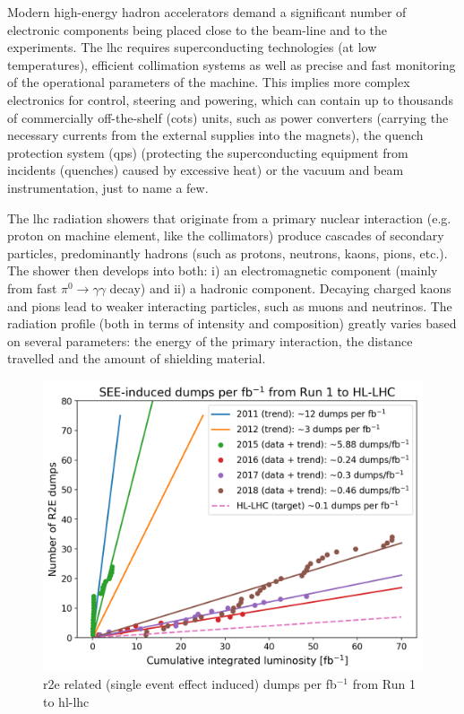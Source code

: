 \documentclass[encoding=utf8,british]{tumphthesis}
\begin{document}
Modern high-energy hadron accelerators demand a significant number of electronic components being placed close to the beam-line and to the experiments. The \acrshort{lhc} requires superconducting technologies (at low temperatures), efficient collimation systems as well as precise and fast monitoring of the operational parameters of the machine. This implies more complex electronics for control, steering and powering, which can contain up to thousands of commercially off-the-shelf (\acrshort{cots}) units, such as power converters (carrying the necessary currents from the external supplies into the magnets), the  quench protection system (\acrshort{qps}) (protecting the superconducting equipment from incidents (quenches)  caused by excessive heat) or the vacuum and beam instrumentation, just to name a few.


\begin{minipage}[t]{0.35\linewidth}


The \acrshort{lhc} radiation showers that originate from a primary nuclear interaction (e.g. proton on machine element, like the collimators) produce cascades of secondary particles, predominantly hadrons (such as protons, neutrons, kaons, pions, etc.). The shower then develops into both: i) an electromagnetic component (mainly from fast $\pi^0 \to \gamma\gamma$ decay) and ii) a hadronic component. Decaying charged kaons and pions lead to weaker interacting particles, such as muons and neutrinos. The radiation profile (both in terms of intensity and composition) greatly varies based on several parameters: the energy of the primary interaction, the distance travelled and the amount of shielding material.

\end{minipage}
\hspace{0.5cm}
\hfill%
\begin{minipage}[t]{0.575\linewidth}

\begin{figure}[H]
    \centering
    \includegraphics[width=1.0\linewidth]{figures/r2e_dumps.png}
    \caption{\acrshort{r2e} related (single event effect induced) dumps per fb$^{-1}$ from Run 1 to \acrshort{hl-lhc}}
    \label{fig:r2e_dumps}
\end{figure}

\end{minipage}
\end{document}
